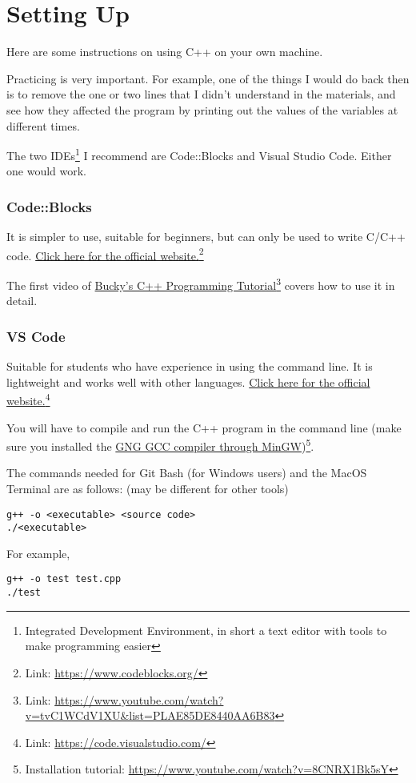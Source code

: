 \chapter{Setting Up}
\label{sec:settingup}
Here are some instructions on using C++ on your own machine.

Practicing is very important. For example, one of the things I would do back then is to remove the one or two lines that I didn't understand in the materials, and see how they affected the program by printing out the values of the variables at different times. 

The two IDEs\footnote{Integrated Development Environment, in short a text editor with tools to make programming easier} I recommend are Code::Blocks and Visual Studio Code. Either one would work.

\subsection*{Code::Blocks}

It is simpler to use, suitable for beginners, but can only be used to write C/C++ code. \href{https://www.codeblocks.org/}{Click here for the official website.}\footnote{Link: \url{https://www.codeblocks.org/}}

The first video of \href{https://www.youtube.com/watch?v=tvC1WCdV1XU&list=PLAE85DE8440AA6B83}{Bucky's C++ Programming Tutorial}\footnote{Link: \url{https://www.youtube.com/watch?v=tvC1WCdV1XU&list=PLAE85DE8440AA6B83}} covers how to use it in detail.

\subsection*{VS Code}

Suitable for students who have experience in using the command line. It is lightweight and works well with other languages. \href{https://code.visualstudio.com/}{Click here for the official website.}\footnote{Link: \url{https://code.visualstudio.com/}}

You will have to compile and run the C++ program in the command line (make sure you installed the \href{https://www.youtube.com/watch?v=8CNRX1Bk5sY}{GNG GCC compiler through MinGW})\footnote{Installation tutorial: \url{https://www.youtube.com/watch?v=8CNRX1Bk5sY}}.

The commands needed for Git Bash (for Windows users) and the MacOS Terminal are as follows: (may be different for other tools)

\texttt{g++ -o <executable> <source code>}\\
\texttt{./<executable>}

For example,

\texttt{g++ -o test test.cpp}\\
\texttt{./test}
